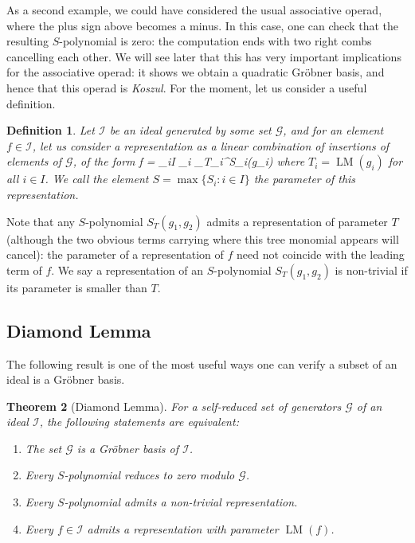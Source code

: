 \documentclass[fleqn, a4paper, twoside]{article}
\makeatletter
\newcommand{\leadm}[1]{\operatorname{LM}(#1)}
\newcommand{\repl}[3]{\square_{#1}^{#2}(#3)}
\newcommand{\0}{\langle 0\rangle}
\newcommand{\II}{\mathcal{I}}
\newcommand{\GG}{\mathcal G}
\newenvironment{tenumerate}{
 \begin{enumerate}
  \setlength{\itemsep}{0pt}
  \setlength{\parskip}{0pt}
}{\end{enumerate}}
\let\[\@undefined
\DeclareRobustCommand{\[}{\begin{equation}}%
\let\]\@undefined
\DeclareRobustCommand{\]}{\end{equation}}%
\theoremstyle{mytheorem}
\newtheorem{theorem}{Theorem}[section]
\theoremstyle{introthm}
\theoremstyle{mydefinition}
\newtheorem{definition}[theorem]{Definition}
\theoremstyle{mydefinition2}
\theoremstyle{plain} %
\newcommand{\?}{\,?\,}
\theoremstyle{mytheorem}
\theoremstyle{plain} %
\makeatother
\begin{document}
As a second example, we could have considered the usual
associative operad, where the plus sign above becomes a
minus. In this case, one can check that the resulting 
$S$-polynomial is zero: the computation ends with two
right combs cancelling each other. We will see later
that this has very important implications for the associative
operad: it shows we obtain a quadratic Gr\"obner basis,
and hence that this operad is \emph{Koszul}.
For the moment, let us consider a useful
definition.

\begin{definition} Let $\II$ be an ideal generated by some
set $\GG$, and for an element $f\in \II$, let us consider
a representation as a linear combination of insertions of
elements of $\GG$, of the form
\[
f = \sum_{i\in I} \lambda_i \repl{T_i}{S_i}{g_i}
\]
where $T_i = \leadm{g_i}$ for all $i\in I$. We call the element
$S = \max \{ S_i : i \in I\}$ the parameter of this representation.
\end{definition}

Note that any $S$-polynomial $S_T(g_1,g_2)$ admits a representation
of parameter $T$ (although the two obvious terms carrying
where this tree monomial appears will cancel): the parameter
of a representation of $f$ need not coincide with the
leading term of $f$. We say a representation of an
$S$-polynomial $S_T(g_1,g_2)$ is non-trivial if its parameter
is smaller than $T$.

\subsection{Diamond Lemma}
The following result is one of the most useful ways one can
verify a subset of an ideal is a Gr\"obner basis.

\begin{theorem}[Diamond Lemma]
For a self-reduced set of generators $\GG$ of an ideal $\II$,
the following statements are equivalent:
\begin{tenumerate}
\item The set $\GG$ is a Gr\"obner basis of $\II$.
\item Every $S$-polynomial reduces to zero modulo $\GG$.
\item Every $S$-polynomial admits a non-trivial representation.
\item Every $f\in \II$ admits a representation with
parameter $\leadm{f}$.
\end{tenumerate}
\end{theorem}
\end{document}
